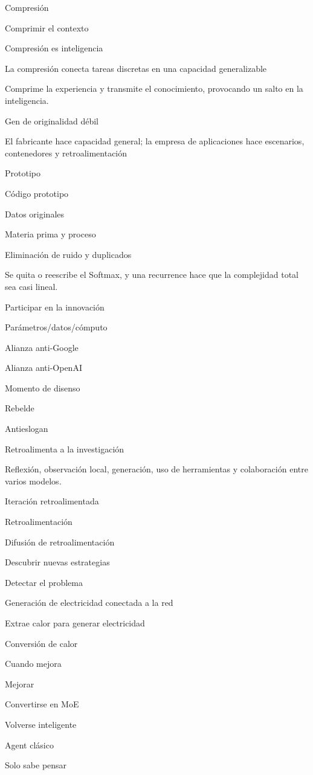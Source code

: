 \documentclass{article}
\begin{document}
Compresión

Comprimir el contexto

Compresión es inteligencia

La compresión conecta tareas discretas en una capacidad generalizable

Comprime la experiencia y transmite el conocimiento, provocando un salto en la inteligencia.

Gen de originalidad débil

El fabricante hace capacidad general; la empresa de aplicaciones hace escenarios, contenedores y retroalimentación

Prototipo

Código prototipo

Datos originales

Materia prima y proceso

Eliminación de ruido y duplicados

Se quita o reescribe el Softmax, y una recurrence hace que la complejidad total sea casi lineal.

Participar en la innovación

Parámetros/datos/cómputo

Alianza anti-Google

Alianza anti-OpenAI

Momento de disenso

Rebelde

Antieslogan

Retroalimenta a la investigación

Reflexión, observación local, generación, uso de herramientas y colaboración entre varios modelos.

Iteración retroalimentada

Retroalimentación

Difusión de retroalimentación

Descubrir nuevas estrategias

Detectar el problema

Generación de electricidad conectada a la red

Extrae calor para generar electricidad

Conversión de calor

Cuando mejora

Mejorar

Convertirse en MoE

Volverse inteligente

Agent clásico

Solo sabe pensar
\end{document}
